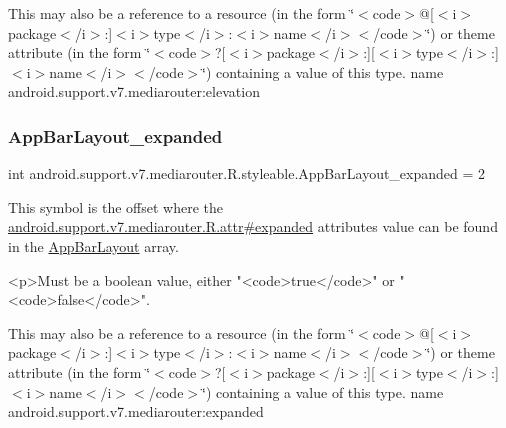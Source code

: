 This may also be a reference to a resource (in the form \char`\"{}$<$code$>$@\mbox{[}$<$i$>$package$<$/i$>$\+:\mbox{]}$<$i$>$type$<$/i$>$\+:$<$i$>$name$<$/i$>$$<$/code$>$\char`\"{}) or theme attribute (in the form \char`\"{}$<$code$>$?\mbox{[}$<$i$>$package$<$/i$>$\+:\mbox{]}\mbox{[}$<$i$>$type$<$/i$>$\+:\mbox{]}$<$i$>$name$<$/i$>$$<$/code$>$\char`\"{}) containing a value of this type.  name android.\+support.\+v7.\+mediarouter\+:elevation \mbox{\label{classandroid_1_1support_1_1v7_1_1mediarouter_1_1R_1_1styleable_a7af4ef569f9c7c7a9c4ee947088887d0}} 
\subsubsection{\texorpdfstring{App\+Bar\+Layout\+\_\+expanded}{AppBarLayout\_expanded}}
{\footnotesize\ttfamily int android.\+support.\+v7.\+mediarouter.\+R.\+styleable.\+App\+Bar\+Layout\+\_\+expanded = 2\hspace{0.3cm}{\ttfamily [static]}}

This symbol is the offset where the \hyperlink{classandroid_1_1support_1_1v7_1_1mediarouter_1_1R_1_1attr_a03cd232d62bb29f337ad465e753df1e6}{android.\+support.\+v7.\+mediarouter.\+R.\+attr\#expanded} attribute\textquotesingle{}s value can be found in the \hyperlink{classandroid_1_1support_1_1v7_1_1mediarouter_1_1R_1_1styleable_abcffe94741186dacd49a336e4ab2becb}{App\+Bar\+Layout} array.

\begin{DoxyVerb}      <p>Must be a boolean value, either "<code>true</code>" or "<code>false</code>".
\end{DoxyVerb}
 

This may also be a reference to a resource (in the form \char`\"{}$<$code$>$@\mbox{[}$<$i$>$package$<$/i$>$\+:\mbox{]}$<$i$>$type$<$/i$>$\+:$<$i$>$name$<$/i$>$$<$/code$>$\char`\"{}) or theme attribute (in the form \char`\"{}$<$code$>$?\mbox{[}$<$i$>$package$<$/i$>$\+:\mbox{]}\mbox{[}$<$i$>$type$<$/i$>$\+:\mbox{]}$<$i$>$name$<$/i$>$$<$/code$>$\char`\"{}) containing a value of this type.  name android.\+support.\+v7.\+mediarouter\+:expanded \mbox{\label{classandroid_1_1support_1_1v7_1_1mediarouter_1_1R_1_1styleable_ad56052828eb14d75ca60a6e450bcbcd5}} 
